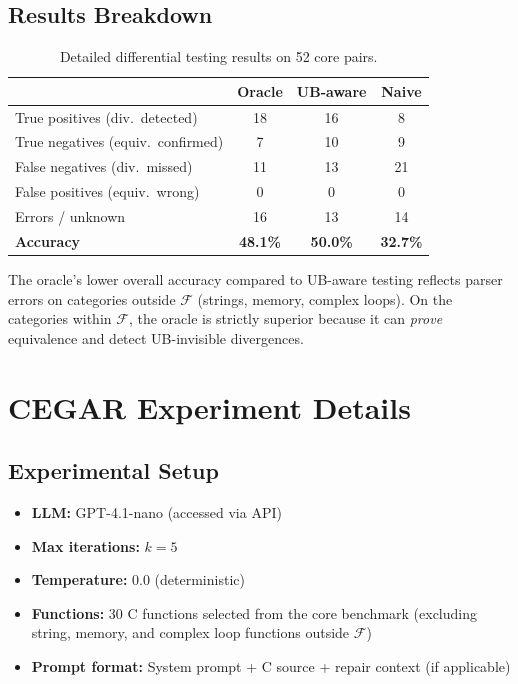 \documentclass[11pt]{article}
\begin{document}
\subsection{Results Breakdown}

\begin{table}[H]
\centering
\caption{Detailed differential testing results on 52 core pairs.}\label{tab:difftest-detail}
\begin{tabular}{@{}lccc@{}}
\toprule
& \textbf{Oracle} & \textbf{UB-aware} & \textbf{Naive} \\
\midrule
True positives (div.\ detected)  & 18 & 16 & 8 \\
True negatives (equiv.\ confirmed) & 7 & 10 & 9 \\
False negatives (div.\ missed)    & 11 & 13 & 21 \\
False positives (equiv.\ wrong)   & 0 & 0 & 0 \\
Errors / unknown                  & 16 & 13 & 14 \\
\midrule
\textbf{Accuracy}                 & \textbf{48.1\%} & \textbf{50.0\%} & \textbf{32.7\%} \\
\bottomrule
\end{tabular}
\end{table}

The oracle's lower overall accuracy compared to UB-aware testing reflects
parser errors on categories outside $\mathcal{F}$ (strings, memory, complex
loops).  On the categories within $\mathcal{F}$, the oracle is strictly
superior because it can \emph{prove} equivalence and detect UB-invisible
divergences.

\section{CEGAR Experiment Details}\label{app:cegar-details}

\subsection{Experimental Setup}

\begin{itemize}[nosep]
\item \textbf{LLM:} GPT-4.1-nano (accessed via API)
\item \textbf{Max iterations:} $k = 5$
\item \textbf{Temperature:} 0.0 (deterministic)
\item \textbf{Functions:} 30 C functions selected from the core benchmark
      (excluding string, memory, and complex loop functions outside
      $\mathcal{F}$)
\item \textbf{Prompt format:} System prompt + C source + repair context
      (if applicable)
\end{itemize}
\end{document}
